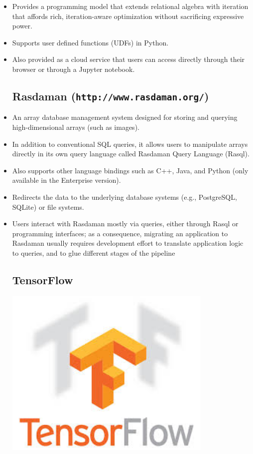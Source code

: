 \documentclass[a0,landscape]{a0poster}
\begin{document}
\begin{multicols}{3}
\begin{itemize}
\item Provides a programming model that extends relational algebra with
iteration that affords rich, iteration-aware optimization without sacrificing
expressive power.

\item Supports user defined functions (UDFs) in Python.

\item Also provided as a cloud service that users can access directly
through their browser or through a Jupyter notebook.

\subsection*{Rasdaman (\texttt{http://www.rasdaman.org/})}

\item An array database management system designed for storing and
querying high-dimensional arrays (such as images).

\item  In addition to conventional SQL queries, it allows users to manipulate arrays directly in its own query language called Rasdaman Query
Language (Rasql).

\item Also supports other language bindings such as C++, Java, and Python (only available in the Enterprise version).

\item Redirects the data to the underlying database systems (e.g., PostgreSQL, SQLite) or file systems.

\item Users interact with Rasdaman mostly via queries, either through Rasql or
programming interfaces; as a consequence, migrating an application to Rasdaman
usually requires development effort to translate application logic to queries,
and to glue different stages of the pipeline

\subsection*{TensorFlow} \includegraphics[width=10cm]{tensor-flow-logo.png}


\end{itemize}
\end{multicols}
\end{document}
